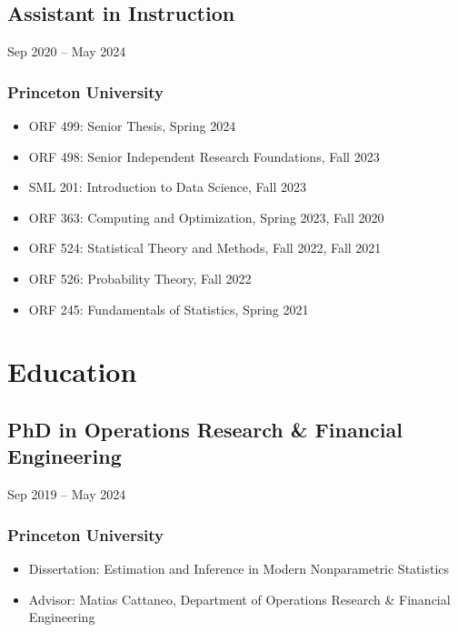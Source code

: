 \documentclass{wgu-cv}
\begin{document}
\subsection{Assistant in Instruction}
{Sep 2020 -- May 2024}
\subsubsection{Princeton University}

\begin{itemize}

  \item
    ORF 499:
    Senior Thesis,
    Spring 2024

  \item
    ORF 498:
    Senior Independent Research Foundations,
    Fall 2023

  \item
    SML 201:
    Introduction to Data Science,
    Fall 2023

  \item
    ORF 363:
    Computing and Optimization,
    Spring 2023, Fall 2020

  \item
    ORF 524:
    Statistical Theory and Methods,
    Fall 2022, Fall 2021

  \item
    ORF 526:
    Probability Theory,
    Fall 2022

  \item
    ORF 245:
    Fundamentals of Statistics,
    Spring 2021

\end{itemize}

\vspace*{3mm}

\section{Education}

\subsection{PhD in Operations Research \& Financial Engineering}
{Sep 2019 -- May 2024}
\subsubsection{Princeton University}

\begin{itemize}
  \item Dissertation:
    Estimation and Inference in Modern Nonparametric Statistics
  \item Advisor:
    Matias Cattaneo, Department of Operations Research \& Financial Engineering
\end{itemize}
\end{document}
